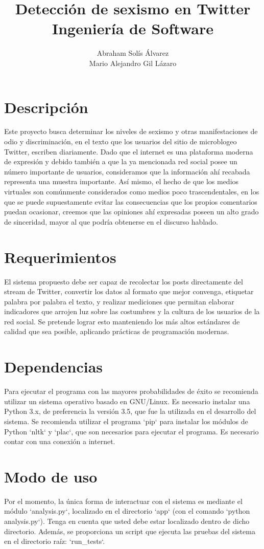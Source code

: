 \documentclass{scrartcl}
\title {Detección de sexismo en Twitter \\ Ingeniería de Software}
\author{Abraham Solís Álvarez \\ Mario Alejandro Gil Lázaro}
\begin{document}
 \maketitle \tableofcontents

\section{Descripción}
Este proyecto busca determinar los niveles de sexismo y otras manifestaciones
de odio y discriminación, en el texto que los usuarios del sitio de
microblogeo Twitter, escriben diariamente. Dado que el internet es una
plataforma moderna de expresión y debido también a que la ya mencionada red
social posee un número importante de usuarios, consideramos que la información
ahí recabada representa una muestra importante. Así mismo, el hecho de que
los medios virtuales son comúnmente considerados como medios poco
trascendentales, en los que se puede supuestamente evitar las consecuencias
que los propios comentarios puedan ocasionar, creemos que las opiniones ahí
expresadas poseen un alto grado de sinceridad, mayor al que podría obtenerse
en el discurso hablado.

\section{Requerimientos}
El sistema propuesto debe ser capaz de recolectar los posts directamente del
stream de Twitter, convertir los datos al formato que mejor convenga, etiquetar
palabra por palabra el texto, y realizar mediciones que permitan elaborar
indicadores que arrojen luz sobre las costumbres y la cultura de los usuarios
de la red social. Se pretende lograr esto manteniendo los más altos estándares
de calidad que sea posible, aplicando prácticas de programación modernas.

\section{Dependencias}
Para ejecutar el programa con las mayores probabilidades de éxito se recomienda
utilizar un sistema operativo basado en GNU/Linux. Es necesario instalar una
Python 3.x, de preferencia la versión 3.5, que fue la utilizada en el
desarrollo del sistema. Se recomienda utilizar el programa `pip` para instalar
los módulos de Python `nltk` y `plac`, que son necesarios para ejecutar el
programa. Es necesario contar con una conexión a internet.

\section{Modo de uso}
Por el momento, la única forma de interactuar con el sistema es mediante el
módulo `analysis.py`, localizado en el directorio `app` (con el comando
`python analysis.py`). Tenga en cuenta que usted debe estar localizado dentro
de dicho directorio. Además, se proporciona un script que ejecuta las pruebas
del sistema en el directorio raíz: `run_tests`.
\end{document}
